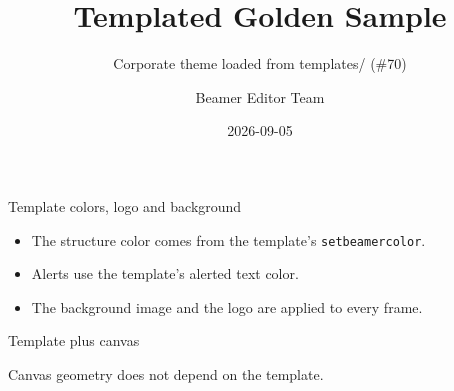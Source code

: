 \documentclass[aspectratio=169]{beamer}
\title{Templated Golden Sample}
\subtitle{Corporate theme loaded from templates/ (\#70)}
\author{Beamer Editor Team}
\date{2026-09-05}
\begin{document}
\begin{frame}
  \titlepage
\end{frame}

\begin{frame}{Template colors, logo and background}
  \begin{itemize}
    \item The structure color comes from the template's \texttt{setbeamercolor}.
    \item \alert{Alerts} use the template's alerted text color.
    \item The background image and the logo are applied to every frame.
  \end{itemize}
\end{frame}

\begin{frame}[label=templated-canvas]{Template plus canvas}
  \begin{deckcanvas}
    \begin{decktext}[x=0.050,y=0.150,w=0.500,size=normal]
      Canvas geometry does not depend on the template.
    \end{decktext}
  \end{deckcanvas}
\end{frame}
\end{document}
